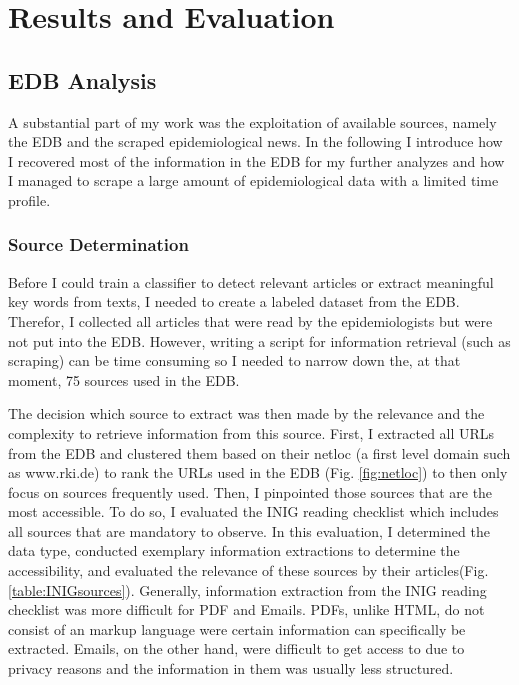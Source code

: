 \chapter{Results and Evaluation}

\section{EDB Analysis}\label{edb analysis}
  A substantial part of my work was the exploitation of available sources, namely the EDB and the scraped epidemiological news. In the following I introduce how I recovered most of the information in the EDB for my further analyzes and how I managed to scrape a large amount of epidemiological data with a limited time profile.

\subsection{Source Determination}
  Before I could train a classifier to detect relevant articles or extract meaningful key words from texts, I needed to create a labeled dataset from the EDB. Therefor, I collected all articles that were read by the epidemiologists but were not put into the EDB. However, writing a script for information retrieval (such as scraping) can be time consuming so I needed to narrow down the, at that moment, 75 sources used in the EDB.

  The decision which source to extract was then made by the relevance and the complexity to retrieve information from this source.
  First, I extracted all URLs from the EDB and clustered them based on their netloc (a first level domain such as www.rki.de) to rank the URLs used in the EDB (Fig. \ref{fig:netloc}) to then only focus on sources frequently used. Then, I pinpointed those sources that are the most accessible. To do so, I evaluated the INIG reading checklist which includes all sources that are mandatory to observe. In this evaluation, I determined the data type, conducted exemplary information extractions to determine the accessibility, and evaluated the relevance of these sources by their articles(Fig. \ref{table:INIGsources}). Generally, information extraction from the INIG reading checklist was more difficult for PDF and Emails. PDFs, unlike HTML, do not consist of an markup language were certain information can specifically be extracted. Emails, on the other hand, were difficult to get access to due to privacy reasons and the information in them was usually less structured.


